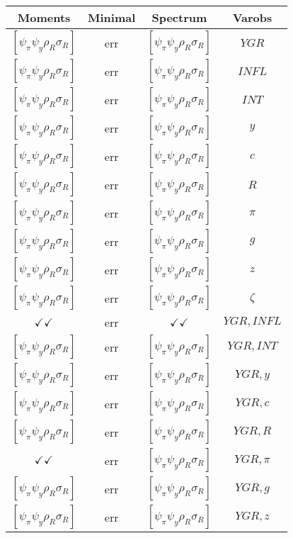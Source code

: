 \documentclass[a4paper,10pt]{article}
\begin{document}
\centering
\begin{longtable}{|c|c|c|c|}
\hline
Moments & Minimal & Spectrum & Varobs \\
\hline
$[\psi_\pi \psi_y \rho_R \sigma_R ]$ & err & $[\psi_\pi \psi_y \rho_R \sigma_R ]$ & ${YGR}$ \\
\hline
$[\psi_\pi \psi_y \rho_R \sigma_R ]$ & err & $[\psi_\pi \psi_y \rho_R \sigma_R ]$ & ${INFL}$ \\
\hline
$[\psi_\pi \psi_y \rho_R \sigma_R ]$ & err & $[\psi_\pi \psi_y \rho_R \sigma_R ]$ & ${INT}$ \\
\hline
$[\psi_\pi \psi_y \rho_R \sigma_R ]$ & err & $[\psi_\pi \psi_y \rho_R \sigma_R ]$ & ${y}$ \\
\hline
$[\psi_\pi \psi_y \rho_R \sigma_R ]$ & err & $[\psi_\pi \psi_y \rho_R \sigma_R ]$ & ${c}$ \\
\hline
$[\psi_\pi \psi_y \rho_R \sigma_R ]$ & err & $[\psi_\pi \psi_y \rho_R \sigma_R ]$ & ${R}$ \\
\hline
$[\psi_\pi \psi_y \rho_R \sigma_R ]$ & err & $[\psi_\pi \psi_y \rho_R \sigma_R ]$ & ${\pi}$ \\
\hline
$[\psi_\pi \psi_y \rho_R \sigma_R ]$ & err & $[\psi_\pi \psi_y \rho_R \sigma_R ]$ & ${g}$ \\
\hline
$[\psi_\pi \psi_y \rho_R \sigma_R ]$ & err & $[\psi_\pi \psi_y \rho_R \sigma_R ]$ & ${z}$ \\
\hline
$[\psi_\pi \psi_y \rho_R \sigma_R ]$ & err & $[\psi_\pi \psi_y \rho_R \sigma_R ]$ & ${\zeta}$ \\
\hline
$\checkmark\checkmark$ & err & $\checkmark\checkmark$ & ${YGR},{INFL}$ \\
\hline
$[\psi_\pi \psi_y \rho_R \sigma_R ]$ & err & $[\psi_\pi \psi_y \rho_R \sigma_R ]$ & ${YGR},{INT}$ \\
\hline
$[\psi_\pi \psi_y \rho_R \sigma_R ]$ & err & $[\psi_\pi \psi_y \rho_R \sigma_R ]$ & ${YGR},{y}$ \\
\hline
$[\psi_\pi \psi_y \rho_R \sigma_R ]$ & err & $[\psi_\pi \psi_y \rho_R \sigma_R ]$ & ${YGR},{c}$ \\
\hline
$[\psi_\pi \psi_y \rho_R \sigma_R ]$ & err & $[\psi_\pi \psi_y \rho_R \sigma_R ]$ & ${YGR},{R}$ \\
\hline
$\checkmark\checkmark$ & err & $[\psi_\pi \psi_y \rho_R \sigma_R ]$ & ${YGR},{\pi}$ \\
\hline
$[\psi_\pi \psi_y \rho_R \sigma_R ]$ & err & $[\psi_\pi \psi_y \rho_R \sigma_R ]$ & ${YGR},{g}$ \\
\hline
$[\psi_\pi \psi_y \rho_R \sigma_R ]$ & err & $[\psi_\pi \psi_y \rho_R \sigma_R ]$ & ${YGR},{z}$ \\

\end{longtable}
\end{document}
